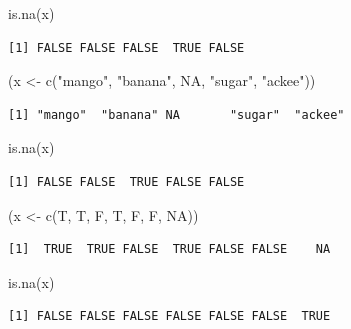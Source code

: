 \documentclass[
]{book}
\newenvironment{Shaded}{\begin{snugshade}}{\end{snugshade}}
\newcommand{\ConstantTok}[1]{\textcolor[rgb]{0.00,0.00,0.00}{#1}}
\newcommand{\FunctionTok}[1]{\textcolor[rgb]{0.00,0.00,0.00}{#1}}
\newcommand{\NormalTok}[1]{#1}
\newcommand{\OtherTok}[1]{\textcolor[rgb]{0.56,0.35,0.01}{#1}}
\newcommand{\StringTok}[1]{\textcolor[rgb]{0.31,0.60,0.02}{#1}}
\begin{document}
\begin{Shaded}
\begin{Highlighting}[]
\FunctionTok{is.na}\NormalTok{(x)}
\end{Highlighting}
\end{Shaded}

\begin{verbatim}
[1] FALSE FALSE FALSE  TRUE FALSE
\end{verbatim}

\begin{Shaded}
\begin{Highlighting}[]
\NormalTok{(x }\OtherTok{\textless{}{-}} \FunctionTok{c}\NormalTok{(}\StringTok{"mango"}\NormalTok{, }\StringTok{"banana"}\NormalTok{, }\ConstantTok{NA}\NormalTok{, }\StringTok{"sugar"}\NormalTok{, }\StringTok{"ackee"}\NormalTok{))}
\end{Highlighting}
\end{Shaded}

\begin{verbatim}
[1] "mango"  "banana" NA       "sugar"  "ackee" 
\end{verbatim}

\begin{Shaded}
\begin{Highlighting}[]
\FunctionTok{is.na}\NormalTok{(x)}
\end{Highlighting}
\end{Shaded}

\begin{verbatim}
[1] FALSE FALSE  TRUE FALSE FALSE
\end{verbatim}

\begin{Shaded}
\begin{Highlighting}[]
\NormalTok{(x }\OtherTok{\textless{}{-}} \FunctionTok{c}\NormalTok{(T, T, F, T, F, F, }\ConstantTok{NA}\NormalTok{))}
\end{Highlighting}
\end{Shaded}

\begin{verbatim}
[1]  TRUE  TRUE FALSE  TRUE FALSE FALSE    NA
\end{verbatim}

\begin{Shaded}
\begin{Highlighting}[]
\FunctionTok{is.na}\NormalTok{(x)}
\end{Highlighting}
\end{Shaded}

\begin{verbatim}
[1] FALSE FALSE FALSE FALSE FALSE FALSE  TRUE
\end{verbatim}
\end{document}
